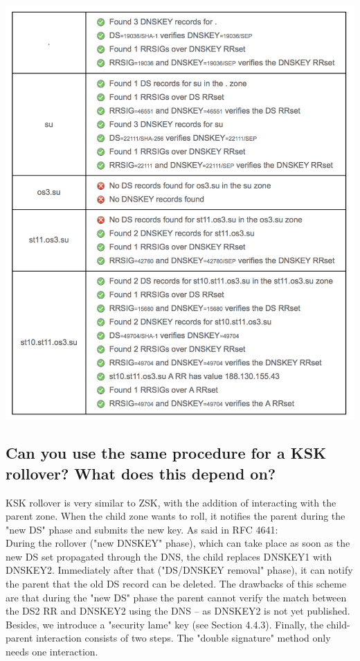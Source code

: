 \documentclass[a4paper,11pt]{article}
\begin{document}
\includegraphics{after}

\subsection{Can you use the same procedure for a KSK rollover? What does this depend on?}
KSK rollover is very similar to ZSK, with the addition of interacting with the parent zone. When the child zone wants to roll, it notifies the parent during the "new DS" phase and submits the new key. As said in RFC 4641: \\
During the rollover ("new DNSKEY" phase),
   which can take place as soon as the new DS set propagated through the
   DNS, the child replaces DNSKEY1 with DNSKEY2.  Immediately after that
   ("DS/DNSKEY removal" phase), it can notify the parent that the old DS
   record can be deleted.
   The drawbacks of this scheme are that during the "new DS" phase the
   parent cannot verify the match between the DS2 RR and DNSKEY2 using
   the DNS -- as DNSKEY2 is not yet published.  Besides, we introduce a
   "security lame" key (see Section 4.4.3).  Finally, the child-parent
   interaction consists of two steps.  The "double signature" method
   only needs one interaction.
\end{document}
